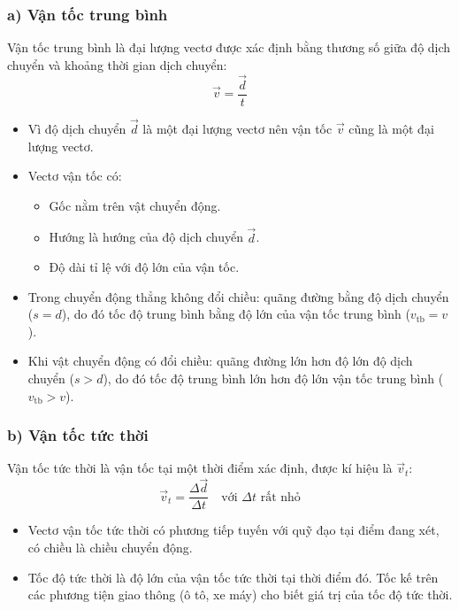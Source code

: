 \subsubsection*{a) Vận tốc trung bình}
Vận tốc trung bình là đại lượng vectơ được xác định bằng thương số giữa độ dịch chuyển và khoảng thời gian dịch chuyển:
\[
\vec{v} = \frac{\vec{d}}{t}
\]
\begin{itemize}
    \item Vì độ dịch chuyển $\vec{d}$ là một đại lượng vectơ nên vận tốc $\vec{v}$ cũng là một đại lượng vectơ.
    \item Vectơ vận tốc có:
    \begin{itemize}
        \item Gốc nằm trên vật chuyển động.
        \item Hướng là hướng của độ dịch chuyển $\vec{d}$.
        \item Độ dài tỉ lệ với độ lớn của vận tốc.
    \end{itemize}
    \item Trong chuyển động thẳng không đổi chiều: quãng đường bằng độ dịch chuyển ($s = d$), do đó tốc độ trung bình bằng độ lớn của vận tốc trung bình ($v_{\text{tb}} = v$).
    \item Khi vật chuyển động có đổi chiều: quãng đường lớn hơn độ lớn độ dịch chuyển ($s > d$), do đó tốc độ trung bình lớn hơn độ lớn vận tốc trung bình ($v_{\text{tb}} > v$).
\end{itemize}

\subsubsection*{b) Vận tốc tức thời}
Vận tốc tức thời là vận tốc tại một thời điểm xác định, được kí hiệu là $\vec{v}_t$:
\[
\vec{v}_t = \frac{\Delta\vec{d}}{\Delta t} \quad \text{với } \Delta t \text{ rất nhỏ}
\]
\begin{itemize}
    \item Vectơ vận tốc tức thời có phương tiếp tuyến với quỹ đạo tại điểm đang xét, có chiều là chiều chuyển động.
    \item Tốc độ tức thời là độ lớn của vận tốc tức thời tại thời điểm đó. Tốc kế trên các phương tiện giao thông (ô tô, xe máy) cho biết giá trị của tốc độ tức thời.
\end{itemize}

